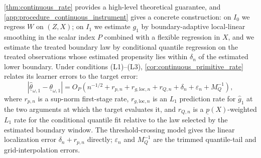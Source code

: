 \cref{thm:continuous_rate} provides a high-level theoretical guarantee, and \cref{app:procedure_continuous_instrument} gives a concrete construction: on $I_0$ we regress $W$ on $(Z,X)$; on $I_1$ we estimate $g_1$ by boundary-adaptive local-linear smoothing in the scalar index $P$ combined with a flexible regression in $X$, and we estimate the treated boundary law by conditional quantile regression on the treated observations whose estimated propensity lies within $\delta_n$ of the estimated lower boundary. Under conditions (L1)--(L3), \cref{cor:continuous_primitive_rate} relates its learner errors to the target error:
\[
    |\hat{\underline\theta}_{\omega,1}-\underline\theta_{\omega,1}|
    =O_P\!\left(n^{-1/2}+r_{p,n}+r_{g,\mathrm{loc},n}
    +r_{Q,n}+\delta_n+\varepsilon_n+M_Q^{-1}\right),
\]
where $r_{p,n}$ is a sup-norm first-stage rate, $r_{g,\mathrm{loc},n}$ is an $L_1$ prediction rate for $\hat g_1$ at the two arguments at which the target evaluates it, and $r_{Q,n}$ is a $\underline p(X)$-weighted $L_1$ rate for the conditional quantile fit relative to the law selected by the estimated boundary window. The threshold-crossing model gives the linear localization error $\delta_n+r_{p,n}$ directly; $\varepsilon_n$ and $M_Q^{-1}$ are the trimmed quantile-tail and grid-interpolation errors.

